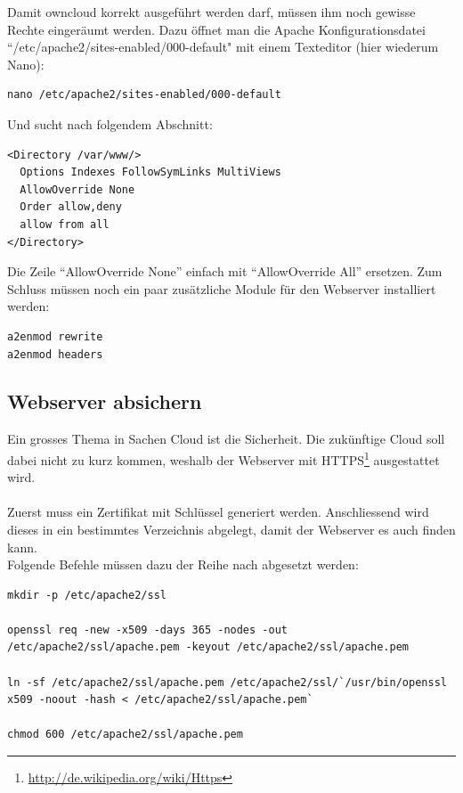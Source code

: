 Damit owncloud korrekt ausgeführt werden darf, müssen ihm noch gewisse Rechte eingeräumt werden. Dazu öffnet man die Apache Konfigurationsdatei ``/etc/apache2/sites-enabled/000-default" mit einem Texteditor (hier wiederum Nano):

\begin{lstlisting}
nano /etc/apache2/sites-enabled/000-default
\end{lstlisting}

Und sucht nach folgendem Abschnitt:

\begin{lstlisting}
<Directory /var/www/>
  Options Indexes FollowSymLinks MultiViews
  AllowOverride None
  Order allow,deny
  allow from all
</Directory>
\end{lstlisting}

Die Zeile ``AllowOverride None'' einfach mit ``AllowOverride All'' ersetzen. Zum Schluss müssen noch ein paar zusätzliche Module für den Webserver installiert werden:

\begin{lstlisting}
a2enmod rewrite
a2enmod headers
\end{lstlisting}

\subsection{Webserver absichern}
Ein grosses Thema in Sachen Cloud ist die Sicherheit. Die zukünftige Cloud soll dabei nicht zu kurz kommen, weshalb der Webserver mit HTTPS\footnote{\url{http://de.wikipedia.org/wiki/Https}} ausgestattet wird.
\\
\\
Zuerst muss ein Zertifikat mit Schlüssel generiert werden. Anschliessend wird dieses in ein bestimmtes Verzeichnis abgelegt, damit der Webserver es auch finden kann.
\\
Folgende Befehle müssen dazu der Reihe nach abgesetzt werden:

\begin{lstlisting}
mkdir -p /etc/apache2/ssl

openssl req -new -x509 -days 365 -nodes -out /etc/apache2/ssl/apache.pem -keyout /etc/apache2/ssl/apache.pem

ln -sf /etc/apache2/ssl/apache.pem /etc/apache2/ssl/`/usr/bin/openssl x509 -noout -hash < /etc/apache2/ssl/apache.pem`

chmod 600 /etc/apache2/ssl/apache.pem
\end{lstlisting}

